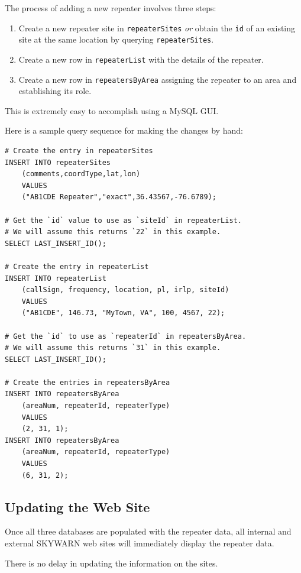 \documentclass[pdflatex,letterpaper,twoside,12pt]{book}
\begin{document}
The process of adding a new repeater involves three steps:

\begin{enumerate}
\item Create a new repeater site in \texttt{repeaterSites} \emph{or} obtain the \texttt{id} of an existing site at the same location by querying \texttt{repeaterSites}.
\item Create a new row in \texttt{repeaterList} with the details of the repeater.
\item Create a new row in \texttt{repeatersByArea} assigning the repeater to an area and establishing its role.
\end{enumerate}

This is extremely easy to accomplish using a MySQL GUI.

Here is a sample query sequence for making the changes by hand:

\begin{verbatim}
# Create the entry in repeaterSites
INSERT INTO repeaterSites
	(comments,coordType,lat,lon)
	VALUES
	("AB1CDE Repeater","exact",36.43567,-76.6789);

# Get the `id` value to use as `siteId` in repeaterList.
# We will assume this returns `22` in this example.
SELECT LAST_INSERT_ID();

# Create the entry in repeaterList
INSERT INTO repeaterList
	(callSign, frequency, location, pl, irlp, siteId)
	VALUES
	("AB1CDE", 146.73, "MyTown, VA", 100, 4567, 22);

# Get the `id` to use as `repeaterId` in repeatersByArea.
# We will assume this returns `31` in this example.
SELECT LAST_INSERT_ID();

# Create the entries in repeatersByArea
INSERT INTO repeatersByArea
	(areaNum, repeaterId, repeaterType)
	VALUES
	(2, 31, 1);
INSERT INTO repeatersByArea
	(areaNum, repeaterId, repeaterType)
	VALUES
	(6, 31, 2);
\end{verbatim}

\subsection{Updating the Web Site}

Once all three databases are populated with the repeater data, all internal and external SKYWARN web sites will immediately display the repeater data.

There is no delay in updating the information on the sites.
\end{document}
